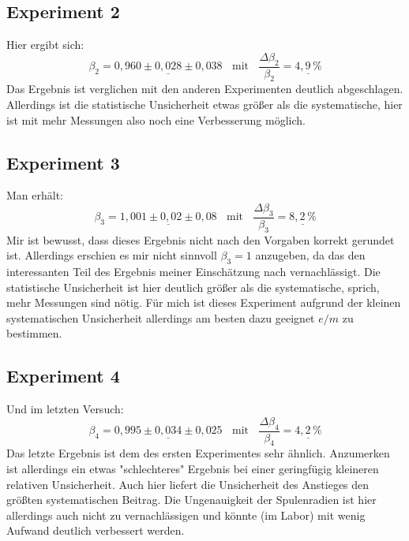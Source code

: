 \documentclass[a4paper,12pt]{article}
\begin{document}
\subsection*{Experiment 2}
Hier ergibt sich:
$$\beta_2=\underline{0,960\pm 0,028\pm 0,038}\ \ \ \ \mathrm{mit}\ \ \ \ \frac{\Delta\beta_2}{\beta_2}=\underline{4,9\,\text{\%}}$$
Das Ergebnis ist verglichen mit den anderen Experimenten deutlich abgeschlagen. Allerdings ist die statistische Unsicherheit etwas größer als die systematische, hier ist mit mehr Messungen also noch eine Verbesserung möglich.
\subsection*{Experiment 3}
Man erhält:
$$\beta_3=\underline{1,001\pm 0,02\pm 0,08}\ \ \ \ \mathrm{mit}\ \ \ \ \frac{\Delta\beta_3}{\beta_3}=\underline{8,2\,\text{\%}}$$
Mir ist bewusst, dass dieses Ergebnis nicht nach den Vorgaben korrekt gerundet ist.  Allerdings erschien es mir nicht sinnvoll $\beta_3=1$ anzugeben, da das den interessanten Teil des Ergebnis meiner Einschätzung nach vernachlässigt. Die statistische Unsicherheit ist hier deutlich größer als die systematische, sprich, mehr Messungen sind nötig. Für mich ist dieses Experiment aufgrund der kleinen systematischen Unsicherheit allerdings am besten dazu geeignet $e/m$ zu bestimmen.
\subsection*{Experiment 4}
Und im letzten Versuch:
$$\beta_4=\underline{0,995\pm 0,034\pm 0,025}\ \ \ \ \mathrm{mit}\ \ \ \ \frac{\Delta\beta_4}{\beta_4}=\underline{4,2\,\text{\%}}$$
Das letzte Ergebnis ist dem des ersten Experimentes sehr ähnlich. Anzumerken ist allerdings ein etwas "schlechteres" Ergebnis bei einer geringfügig kleineren relativen Unsicherheit. Auch hier liefert die Unsicherheit des Anstieges den größten systematischen Beitrag. Die Ungenauigkeit der Spulenradien ist hier allerdings auch nicht zu vernachlässigen und könnte (im Labor) mit wenig Aufwand deutlich verbessert werden.
\end{document}
